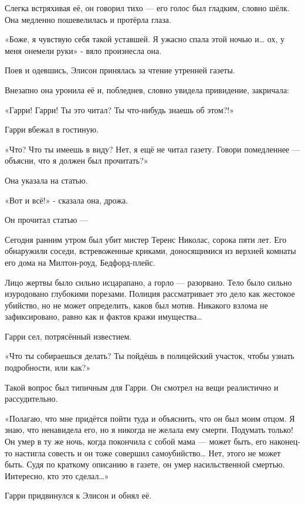 \documentclass[a4paper,12pt]{book}
\begin{document}
Слегка встряхивая её, он говорил тихо — его голос был гладким, словно шёлк. Она медленно пошевелилась и протёрла глаза.
\par
«Боже, я чувствую себя такой уставшей. Я ужасно спала этой ночью и… ох, у меня онемели руки» - вяло произнесла она.
\par
Поев и одевшись, Элисон принялась за чтение утренней газеты.
\par
Внезапно она уронила её и, побледнев, словно увидела привидение, закричала:
\par
«Гарри! Гарри! Ты это читал? Ты что-нибудь знаешь об этом?!»
\par
Гарри вбежал в гостиную.
\par
«Что? Что ты имеешь в виду? Нет, я ещё не читал газету. Говори помедленнее — объясни, что я должен был прочитать?»
\par
Она указала на статью.
\par
«Вот и всё!» - сказала она, дрожа.
\par
Он прочитал статью —\\
\par
Сегодня ранним утром был убит мистер Теренс Николас, сорока пяти лет. Его обнаружили соседи, встревоженные криками, доносящимися из верхней комнаты его дома на Милтон-роуд, Бедфорд-плейс.
\par
Лицо жертвы было сильно исцарапано, а горло — разорвано. Тело было сильно изуродовано глубокими порезами. Полиция рассматривает это дело как жестокое убийство, но не может определить, каков был мотив. Никакого взлома не зафиксировано, равно как и фактов кражи имущества…\\
\par
Гарри сел, потрясённый известием.
\par
«Что ты собираешься делать? Ты пойдёшь в полицейский участок, чтобы узнать подробности, или как?»
\par
Такой вопрос был типичным для Гарри. Он смотрел на вещи реалистично и рассудительно.
\par
«Полагаю, что мне придётся пойти туда и объяснить, что он был моим отцом. Я знаю, что ненавидела его, но я никогда не желала ему смерти. Подумать только! Он умер в ту же ночь, когда покончила с собой мама — может быть, его наконец-то настигла совесть и он тоже совершил самоубийство… Нет, этого не может быть. Судя по краткому описанию в газете, он умер насильственной смертью. Интересно, кто это сделал…»
\par
Гарри придвинулся к Элисон и обнял её.
\par
\end{document}
